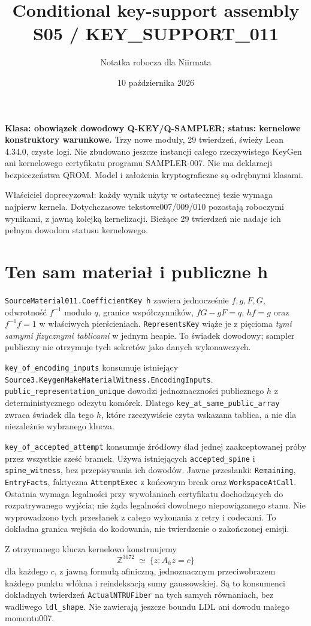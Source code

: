 \documentclass[11pt,a4paper]{article}
\title{Conditional key-support assembly\\\large S05 / KEY\_SUPPORT\_011}
\author{Notatka robocza dla Niirmata}\date{10 października 2026}
\newcommand{\code}[1]{\nolinkurl{#1}}
\begin{document}
\maketitle
\textbf{Klasa: obowiązek dowodowy Q-KEY/Q-SAMPLER; status: kernelowe
konstruktory warunkowe.} Trzy nowe moduły, 29 twierdzeń, świeży Lean 4.34.0,
czyste logi. Nie zbudowano jeszcze instancji całego rzeczywistego KeyGen
ani kernelowego certyfikatu programu SAMPLER-007. Nie ma deklaracji
bezpieczeństwa QROM. Model i założenia kryptograficzne są odrębnymi klasami.

Właściciel doprecyzował: każdy wynik użyty w ostatecznej tezie wymaga
najpierw kernela. Dotychczasowe tekstowe007/009/010 pozostają roboczymi
wynikami, z jawną kolejką kernelizacji. Bieżące 29 twierdzeń nie nadaje
ich pełnym dowodom statusu kernelowego.

\section{Ten sam materiał i publiczne h}
\code{SourceMaterial011.CoefficientKey h} zawiera jednocześnie
$f,g,F,G$, odwrotność $f^{-1}$ modulo $q$, granice współczynników,
$fG-gF=q$, $hf=g$ oraz $f^{-1}f=1$ w właściwych pierścieniach.
\code{RepresentsKey} wiąże je z pięcioma \emph{tymi samymi fizycznymi
tablicami} w jednym heapie. To świadek dowodowy; sampler publiczny nie
otrzymuje tych sekretów jako danych wykonawczych.

\code{key_of_encoding_inputs} konsumuje istniejący
\code{Source3.KeygenMakeMaterialWitness.EncodingInputs}.
\code{public_representation_unique} dowodzi jednoznaczności publicznego
$h$ z deterministycznego odczytu komórek. Dlatego
\code{key_at_same_public_array} zwraca świadek dla tego $h$, które rzeczywiście
czyta wskazana tablica, a nie dla niezależnie wybranego klucza.

\code{key_of_accepted_attempt} konsumuje źródłowy ślad jednej zaakceptowanej
próby przez wszystkie sześć bramek. Używa istniejących
\code{accepted_spine} i \code{spine_witness}, bez przepisywania ich dowodów.
Jawne przesłanki: \code{Remaining}, \code{EntryFacts}, faktyczna
\code{AttemptExec} z końcowym break oraz \code{WorkspaceAtCall}.
Ostatnia wymaga legalności przy wywołaniach certyfikatu dochodzących do
rozpatrywanego wyjścia; nie żąda legalności dowolnego niepowiązanego stanu.
Nie wyprowadzono tych przesłanek z całego wykonania z retry i codecami.
To dokładna granica wejścia do kodowania, nie twierdzenie o zakończonej emisji.

Z otrzymanego klucza kernelowo konstruujemy
\[
 \mathbb Z^{3072}\ \simeq\ \{z:A_hz=c\}
\]
dla każdego $c$, z jawną formułą afiniczną, jednoznacznym przeciwobrazem
każdego punktu włókna i reindeksacją sumy gaussowskiej.
Są to konsumenci dokładnych twierdzeń \code{ActualNTRUFiber} na tych samych
równaniach, bez wadliwego \code{ldl_shape}. Nie zawierają jeszcze boundu LDL
ani dowodu małego momentu007.
\end{document}
